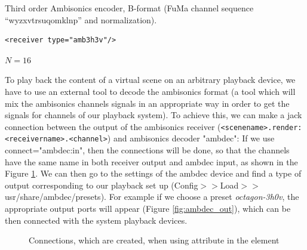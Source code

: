 Third order Ambisonics encoder, B-format (FuMa channel
sequence ``wyzxvtrsuqomklnp'' and normalization).

\begin{lstlisting}[numbers=none]
<receiver type="amb3h3v"/>
\end{lstlisting}

$N=16$

To play back the content of a virtual scene on an arbitrary playback
device, we have to use an external tool to decode the ambisonics
format (a tool which will mix the ambisonics channels signals in an
appropriate way in order to get the signals for channels of our
playback system).  To achieve this, we can make a jack connection
between the output of the ambisonics receiver
(\verb!<scenename>.render:<receivername>.<channel>!) and ambisonics
decoder "ambdec":
%
%
If we use connect="ambdec:in", then the connections will be done, so
that the channels have the same name in both receiver output and
ambdec input, as shown in the Figure \ref{fig:ambdec}. 
%
We can then go to the settings of the ambdec device and find a type of
output corresponding to our playback set up
(Config$>>$Load$>>$usr/share/ambdec/presets). 
%
For example if we choose a preset \textit{octagon-3h0v}, the
appropriate output ports will appear (Figure \ref{fig:ambdec_out}),
which can be then connected with the system playback devices.

\begin{figure}[htb]
  \centering
  \caption{Connections, which are created, when using attribute  in the element }
  \label{fig:ambdec}
\end{figure}
 

